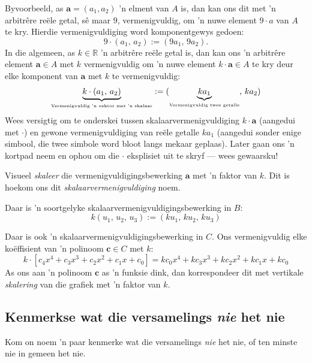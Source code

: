 \documentclass[a4paper,11pt]{book}
\theoremstyle{definition}
\newcommand{\be}{\begin{equation}}
\newcommand{\ee}{\end{equation}}
\newcommand{\ve}[1]{\mathbf{#1}}
\begin{document}
Byvoorbeeld, as $\ve{a} = (a_1, a_2)$ 'n elment van $A$ is, dan kan ons dit
met 'n arbitr{\^e}re re{\"e}le getal, s{\^e} maar $9$, vermenigvuldig, om
'n nuwe element $9\cdot a$ van $A$ te kry. Hierdie vermenigvuldiging word
komponentgewys gedoen:
\be \label{sm_in_A}
9 \cdot (a_1, \,a_2) := (9 a_1, \, 9a_2).
\ee
In die algemeen, as $k \in \mathbb{R}$ 'n arbitr{\^e}re re{\"e}le getal is,
dan kan ons 'n arbitr{\^e}re element $\ve{a} \in A$ met $k$ vermenigvuldig
om 'n nuwe element $k \cdot \ve{a} \in A$ te kry deur elke komponent van
$\ve{a}$ met $k$ te vermenigvuldig:
\[
	\underbrace{k \cdot (a_1, \, a_2)}_{\mbox{\tiny Vermenigvuldig 'n
	vektor met 'n skalaar}} := (\underbrace{k a_1}_{\mbox{\tiny
	Vermenigvuldig twee getalle}}, \, k a_2)
\]
Wees versigtig om te onderskei tussen skalaarvermenigvuldiging $k \cdot
\ve{a}$ (aangedui met $\cdot$) en gewone vermenigvuldiging van re{\"e}le
getalle $k a_1$ (aangedui sonder enige simbool, die twee simbole word bloot
langs mekaar geplaas). Later gaan ons 'n kortpad neem en ophou om die
$\cdot$ eksplisiet uit te skryf --- wees gewaarsku!

Visueel \emph{skaleer} die vermenigvuldigingsbewerking $\ve{a}$ met 'n
faktor van $k$.  Dit is hoekom ons dit \emph{skalaarvermenigvuldiging}
noem.

Daar is 'n soortgelyke skalaarvermenigvuldigingsbewerking in $B$:
\be \label{sm_in_B}
k (u_1, \, u_2, \, u_3) := (k u_1, \, k u_2, \, k u_3)
\ee

Daar is ook 'n skalaarvermenigvuldigingsbewerking in $C$.  Ons
vermenigvuldig elke ko{\"e}ffisient van 'n polinoom $\ve{c} \in C$ met $k$:
\be \label{sm_in_C}
k \cdot [c_4 x^4 + c_3 x^3 + c_2 x^2 + c_1 x + c_0] = k c_0 x^4 + k c_3 x^3
+ k c_2 x^2 + k c_1 x + k c_0
\ee
As ons aan 'n polinoom $\ve{c}$ as 'n funksie dink, dan korrespondeer dit
met vertikale \emph{skalering} van die grafiek met 'n faktor van $k$.

\subsection{Kenmerkse wat die versamelings \emph{nie} het nie}
Kom on noem 'n paar kenmerke wat die versamelings \emph{nie} het nie, of
ten minste nie in gemeen het nie.
\end{document}
